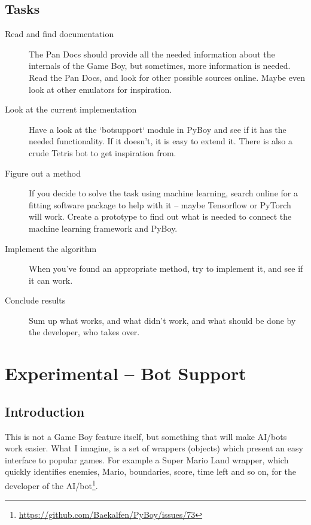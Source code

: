 \documentclass[11pt]{report} %
\begin{document}
\section*{Tasks}
\begin{description}
    \item [Read and find documentation]
        The Pan Docs should provide all the needed information about the internals of the Game Boy, but sometimes, more information is needed. Read the Pan Docs, and look for other possible sources online. Maybe even look at other emulators for inspiration.

    \item [Look at the current implementation]
        Have a look at the `botsupport` module in PyBoy and see if it has the needed functionality. If it doesn't, it is easy to extend it. There is also a crude Tetris bot to get inspiration from.

    \item [Figure out a method]
        If you decide to solve the task using machine learning, search online for a fitting software package to help with it -- maybe Tensorflow or PyTorch will work. Create a prototype to find out what is needed to connect the machine learning framework and PyBoy.

    \item [Implement the algorithm]
        When you've found an appropriate method, try to implement it, and see if it can work.


    \item [Conclude results]
        Sum up what works, and what didn't work, and what should be done by the developer, who takes over.

\end{description}

\chapter*{Experimental -- Bot Support}
\section*{Introduction}
This is not a Game Boy feature itself, but something that will make AI/bots work easier. What I imagine, is a set of wrappers (objects) which present an easy interface to popular games. For example a Super Mario Land wrapper, which quickly identifies enemies, Mario, boundaries, score, time left and so on, for the developer of the AI/bot\footnote{\url{https://github.com/Baekalfen/PyBoy/issues/73}}.
\end{document}
